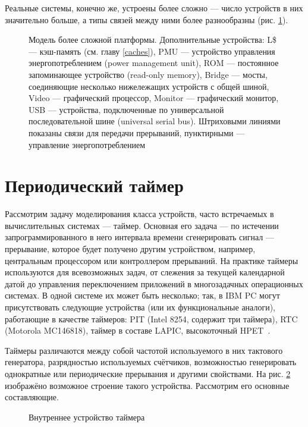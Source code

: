 Реальные системы, конечно же, устроены более сложно — число устройств в них значительно больше, а типы связей между ними более разнообразны (рис. \ref{fig:real-full-platform}).

\begin{figure}[htp]
    \centering
    \caption[Модель более сложной платформы]{Модель более сложной платформы. Дополнительные устройства: L\$ — кэш-память (см. главу \ref{caches}), PMU — устройство управления энергопотреблением (\abbr power management unit), ROM — постоянное запоминающее устройство (\abbr read-only memory), Bridge — мосты, соединяющие несколько нижележащих устройств с общей шиной, Video — графический процессор, Monitor — графический монитор, USB — устройства, подключенные по универсальной последовательной шине (\abbr universal serial bus). Штриховыми линиями показаны связи для передачи прерываний, пунктирными — управление энергопотреблением}
    \label{fig:real-full-platform}
\end{figure}

\section{Периодический таймер}

Рассмотрим задачу моделирования класса устройств, часто встречаемых в вычислительных системах — таймер. Основная его задача — по истечении запрограммированного в него интервала времени сгенерировать сигнал — прерывание, которое будет получено другим устройством, например, центральным процессором или контроллером прерываний. На практике таймеры используются для всевозможных задач, от слежения за текущей календарной датой до управления переключением приложений в многозадачных операционных системах. В одной системе их может быть несколько; так, в IBM PC могут присутствовать следующие устройства (или их функциональные аналоги), работающие в качестве таймеров: PIT (Intel 8254, содержит три таймера), RTC (Motorola MC146818), таймер в составе LAPIC, высокоточный HPET~\cite{hpet}.

Таймеры различаются между собой частотой используемого в них тактового генератора, разрядностью используемых счётчиков, возможностью генерировать однократные или периодические прерывания и другими свойствами.
На рис. \ref{fig:periodic-timer} изображёно возможное строение такого устройства. Рассмотрим его основные составляющие.

\begin{figure}[htp]
    \centering
    \caption[Внутреннее устройство таймера]{Внутреннее устройство таймера}
    \label{fig:periodic-timer}
\end{figure}

